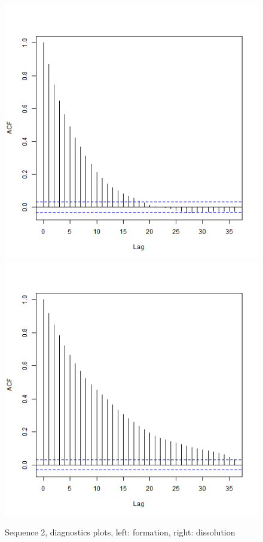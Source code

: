\documentclass[a4paper, 11pt]{report}
\theoremstyle{definition}
\begin{document}
\begin{figure}[h]
\begin{center}
        \includegraphics[scale=0.395]{pictures/net2seq_chain1_BSTERGM_formation_acf.png}
        \includegraphics[scale=0.395]{pictures/net2seq_chain1_BSTERGM_dissolution_acf.png}
    \caption{Sequence 2, diagnostics plots, left: formation, right: dissolution}
    \end{center}
\end{figure}
\end{document}
